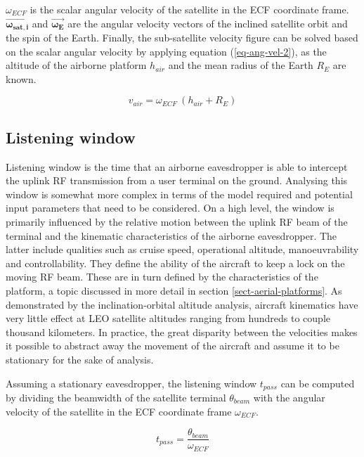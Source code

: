 \documentclass[english, 12pt, a4paper, elec, utf8, a-1b, online]{aaltothesis}
\begin{document}
$\omega_{ECF}$ is the scalar angular velocity of the satellite in the ECF coordinate frame.
$\bm{\vec{\omega_{sat, i}}}$ and $\bm{\vec{\omega_{E}}}$ are the angular velocity vectors of the inclined satellite orbit and the spin of the Earth.
Finally, the sub-satellite velocity figure can be solved based on the scalar angular velocity by applying equation (\ref{eq-ang-vel-2}), as the altitude of the airborne platform $h_{air}$ and the mean radius of the Earth $R_E$ are known.

\begin{equation}
  v_{air} = \omega_{ECF}\ (h_{air} + R_E)
\end{equation}

\subsection{Listening window}

Listening window is the time that an airborne eavesdropper is able to intercept the uplink RF transmission from a user terminal on the ground.
Analysing this window is somewhat more complex in terms of the model required and potential input parameters that need to be considered.
On a high level, the window is primarily influenced by the relative motion between the uplink RF beam of the terminal and the kinematic characteristics of the airborne eavesdropper.
The latter include qualities such as cruise speed, operational altitude, manoeuvrability and controllability.
They define the ability of the aircraft to keep a lock on the moving RF beam.
These are in turn defined by the characteristics of the platform, a topic discussed in more detail in section \ref{sect-aerial-platforms}.
As demonstrated by the inclination-orbital altitude analysis, aircraft kinematics have very little effect at LEO satellite altitudes ranging from hundreds to couple thousand kilometers. In practice, the great disparity between the velocities makes it possible to abstract away the movement of the aircraft and assume it to be stationary for the sake of analysis.

Assuming a stationary eavesdropper, the listening window ${t_{pass}}$ can be computed by dividing the beamwidth of the satellite terminal $\theta_{beam}$ with the angular velocity of the satellite in the ECF coordinate frame $\omega_{ECF}$.

\begin{equation}
  t_{pass} = \frac{\theta_{beam}}{\omega_{ECF}}
\end{equation}
\end{document}
